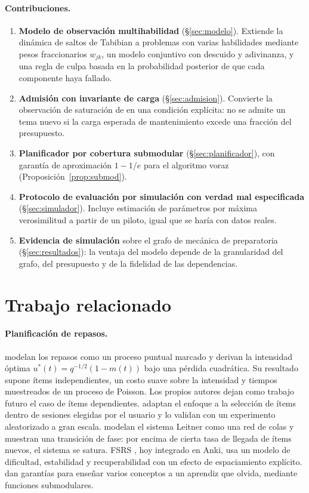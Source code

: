 \documentclass[11pt]{article}
\theoremstyle{definition}
\theoremstyle{remark}
\begin{document}
\paragraph{Contribuciones.}
\begin{enumerate}
\item \textbf{Modelo de observación multihabilidad} (\S\ref{sec:modelo}). Extiende la dinámica de saltos de Tabibian a problemas con varias habilidades mediante pesos fraccionarios $w_{jk}$, un modelo conjuntivo con descuido y adivinanza, y una regla de culpa basada en la probabilidad posterior de que cada componente haya fallado.
\item \textbf{Admisión con invariante de carga} (\S\ref{sec:admision}). Convierte la observación de saturación de \citet{reddy2016} en una condición explícita: no se admite un tema nuevo si la carga esperada de mantenimiento excede una fracción del presupuesto.
\item \textbf{Planificador por cobertura submodular} (\S\ref{sec:planificador}), con garantía de aproximación $1-1/e$ para el algoritmo voraz (Proposición~\ref{prop:submod}).
\item \textbf{Protocolo de evaluación por simulación con verdad mal especificada} (\S\ref{sec:simulador}). Incluye estimación de parámetros por máxima verosimilitud a partir de un piloto, igual que se haría con datos reales.
\item \textbf{Evidencia de simulación} sobre el grafo de mecánica de preparatoria (\S\ref{sec:resultados}): la ventaja del modelo depende de la granularidad del grafo, del presupuesto y de la fidelidad de las dependencias.
\end{enumerate}

\section{Trabajo relacionado}
\label{sec:relacionado}

\paragraph{Planificación de repasos.}
\citet{tabibian2019} modelan los repasos como un proceso puntual marcado y derivan la intensidad óptima $u^\ast(t)=q^{-1/2}(1-m(t))$ bajo una pérdida cuadrática. Su resultado supone ítems independientes, un costo suave sobre la intensidad y tiempos muestreados de un proceso de Poisson. Los propios autores dejan como trabajo futuro el caso de ítems dependientes. \citet{upadhyay2021} adaptan el enfoque a la selección de ítems dentro de sesiones elegidas por el usuario y lo validan con un experimento aleatorizado a gran escala. \citet{reddy2016} modelan el sistema Leitner como una red de colas y muestran una transición de fase: por encima de cierta tasa de llegada de ítems nuevos, el sistema se satura. FSRS \citep{ye2022,su2023}, hoy integrado en Anki, usa un modelo de dificultad, estabilidad y recuperabilidad con un efecto de espaciamiento explícito. \citet{hunziker2019} dan garantías para enseñar varios conceptos a un aprendiz que olvida, mediante funciones submodulares.
\end{document}
